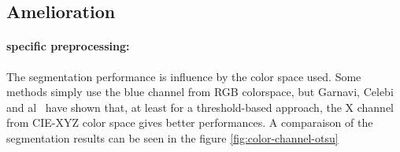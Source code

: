 \documentclass[a4paper,10pt]{article}
\begin{document}
\subsection{Amelioration}
\paragraph{specific preprocessing:}
The segmentation performance is influence by the color space used. Some methods 
 simply use the blue channel from RGB colorspace, but 
Garnavi, Celebi and al~\cite{Garnavi2010} have shown that, at least for a 
threshold-based approach, the X channel from CIE-XYZ color space gives better performances. A comparaison of the segmentation results can be seen in the figure \ref{fig:color-channel-otsu}

\begin{figure}
	

\end{figure}
\end{document}
